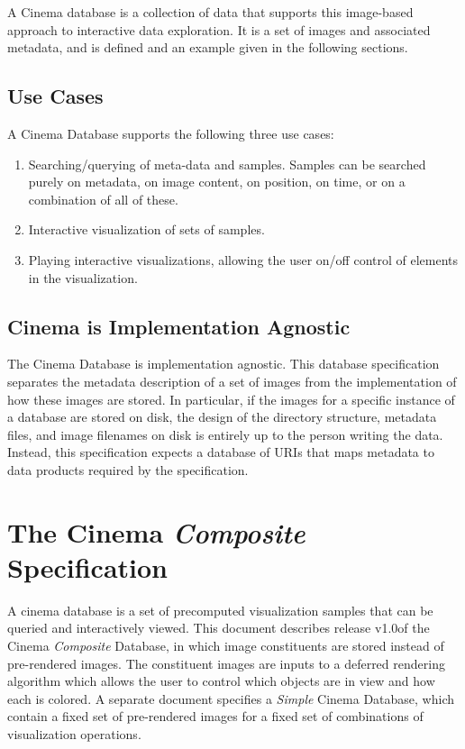 \documentclass{article}
\newcommand{\CinemaSpecVersion} {v1.0}
\newcommand{\Composite} {\textit{Composite}\xspace}
\begin{document}
A Cinema database is a collection of data that supports this image-based approach to interactive data exploration. It is a set of images and associated metadata, and is defined and an example given in the following sections.

\subsection{Use Cases}
A Cinema Database supports the following three use cases:
\begin{enumerate}
\item Searching/querying of meta-data and samples. Samples can be searched purely on metadata, on image content, on position, on time, or on a combination of all of these.
\item Interactive visualization of sets of samples.
\item Playing interactive visualizations, allowing the user on/off control of elements in the visualization.
\end{enumerate}


\subsection{Cinema is Implementation Agnostic}
The Cinema Database is implementation agnostic. This database specification separates the metadata description of a set of images from the implementation of how these images are stored. In particular, if the images for a specific instance of a database are stored on disk, the design of the directory structure, metadata files, and image filenames on disk is entirely up to the person writing the data. Instead, this specification expects a database of URIs that maps metadata to data products required by the specification.

\section{The Cinema \Composite Specification}
A cinema database is a set of precomputed visualization samples that can be queried and interactively viewed. This document describes release \CinemaSpecVersion of the Cinema \Composite Database, in which image constituents are stored instead of pre-rendered images. The constituent images are inputs to a deferred rendering algorithm which allows the user to control which objects are in view and how each is colored. A separate document \cite{cinemaSimpleFileSpec} specifies a \textit{Simple} Cinema Database, which contain a fixed set of pre-rendered images for a fixed set of combinations of visualization operations.
\end{document}
